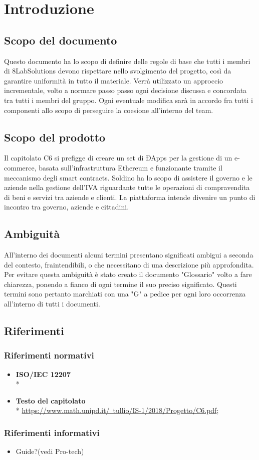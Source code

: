 \section{Introduzione}
\subsection{Scopo del documento}
Questo documento ha lo scopo di definire delle regole di base che tutti i membri di 8LabSolutions devono rispettare nello svolgimento del progetto, così da garantire uniformità in tutto il materiale. Verrà utilizzato un approccio incrementale, volto a normare passo passo ogni decisione discussa e concordata tra tutti i membri del gruppo. Ogni eventuale modifica sarà in accordo fra tutti i componenti allo scopo di perseguire la coesione all'interno del team.
\subsection{Scopo del prodotto}
Il capitolato C6 si prefigge di creare un set di ÐApps per la gestione di un e-commerce, basata sull'infrastruttura Ethereum e funzionante tramite il meccanismo degli smart contracts. Soldino ha lo scopo di assistere il governo e le aziende nella gestione dell'IVA riguardante tutte le operazioni di compravendita di beni e servizi tra aziende e clienti. La piattaforma intende divenire un punto di incontro tra governo, aziende e cittadini.
\subsection{Ambiguità}
All’interno dei documenti alcuni termini presentano significati ambigui  a  seconda del contesto, fraintendibili, o che necessitano di una descrizione più approfondita. Per evitare questa ambiguità è stato creato il documento "Glossario" volto a fare chiarezza, ponendo a fianco di ogni termine il suo preciso significato. Questi termini sono pertanto marchiati con una "G" a pedice per ogni loro occorrenza all'interno di tutti i documenti.
\subsection{Riferimenti}
\subsubsection{Riferimenti normativi}
\begin{itemize}
\item \textbf{ISO/IEC 12207} \\* %
\item \textbf{Testo del capitolato} \\*  \href{https://www.math.unipd.it/~tullio/IS-1/2018/Progetto/C6.pdf}{https://www.math.unipd.it/~tullio/IS-1/2018/Progetto/C6.pdf};
\end{itemize}
\subsubsection{Riferimenti informativi}
\begin{itemize}
\item Guide?(vedi Pro-tech)
\end{itemize}